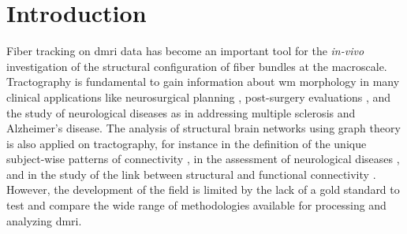 \documentclass[english]{frontiers/frontiersSCNS} %
\begin{document}
\section*{Introduction}
Fiber tracking on \gls*{dmri} data has become an important tool for the \textit{in-vivo} investigation
  of the structural configuration of fiber bundles at the macroscale.
Tractography is fundamental to gain information about \gls*{wm} morphology in many clinical applications
  like neurosurgical planning \citep{golby_interactive_2011}, post-surgery evaluations \citep{toda_utility_2014},
  and the study of neurological diseases as in \citep{chua_diffusion_2008} addressing multiple sclerosis and
  Alzheimer's disease.
The analysis of structural brain networks using graph theory is also applied on tractography,
  for instance in the definition of the unique subject-wise patterns of connectivity
  \citep{sporns_human_2005}, in the assessment of neurological diseases \citep{griffa_structural_2013}, and in the
  study of the link between structural and functional connectivity \citep{messe_predicting_2015}.
However, the development of the field is limited by the lack of a gold standard to test and compare the
  wide range of methodologies available for processing and analyzing \gls*{dmri}.
\end{document}
